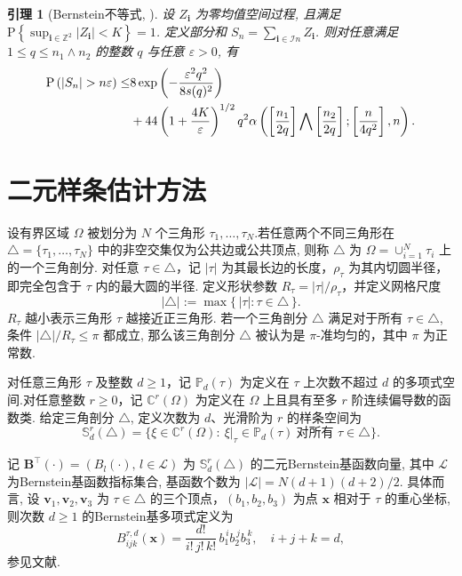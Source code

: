 \documentclass[a4paper,openay,14pt]{ctexbook}
\numberwithin{equation}{section}
\numberwithin{lem}{section}
\newtheorem{lemma}[theorem]{引理}%
\begin{document}
\begin{lemma}[Bernstein不等式, \cite{yao2003exponential}]\label{Lemma:Bernstein}
设 ${Z_{\mathbf{i}}}$ 为零均值空间过程, 且满足$\mathrm{P}\left\{\sup_{\mathbf{i}\in\mathbb{Z}^2}\left\vert Z_{\mathbf{i}}\right\vert<K\right\} = 1$. 定义部分和 $S_n=\sum_{\mathbf{i}\in\mathcal{I}n} Z_{\mathbf{i}}$. 则对任意满足 $1\le q\le n_1\wedge n_2$ 的整数 $q$ 与任意 $\varepsilon>0$, 有
\begin{align*}
    \mathrm{P}\left(\left|S_n\right|>n \varepsilon\right) \leq
    &8\exp \left(-\frac{\varepsilon^2 q^2}{8 s(q)^2}\right)\notag\\
    &+ 44\left(1+\frac{4 K}{\varepsilon}\right)^{1 / 2} q^2 \alpha\left(\left[\frac{n_1}{2 q}\right] \bigwedge\left[\frac{n_2}{2 q}\right] ;\left[\frac{n}{4 q^2}\right], n\right).
    \end{align*}
\end{lemma}

\section{二元样条估计方法}\label{BST}

设有界区域 $\Omega$ 被划分为 $N$ 个三角形 $\tau_{1},\ldots,\tau_{N}$.若任意两个不同三角形在 $\triangle=\{\tau_{1},\ldots,\tau_{N}\}$ 中的非空交集仅为公共边或公共顶点, 则称 $\triangle$ 为 $\Omega=\cup_{i=1}^N \tau_i$ 上的一个三角剖分. 对任意 $\tau\in\triangle$，记 $|\tau|$ 为其最长边的长度，$\rho_\tau$ 为其内切圆半径，即完全包含于 $\tau$ 内的最大圆的半径. 定义形状参数 $R_\tau=|\tau|/\rho_\tau$，并定义网格尺度
\[
|\triangle|:=\max\{\,|\tau|:\tau\in\triangle\,\}.
\]
$R_\tau$ 越小表示三角形 $\tau$ 越接近正三角形. 若一个三角剖分 \(\triangle\) 满足对于所有 \(\tau \in \triangle\), 条件 \(|\triangle|/R_\tau \leq \pi\) 都成立, 那么该三角剖分 \(\triangle\) 被认为是 \(\pi\)-准均匀的，其中 \(\pi\) 为正常数.

对任意三角形 $\tau$ 及整数 $d\ge 1$，记 $\mathbb{P}_d(\tau)$ 为定义在 $\tau$ 上次数不超过 $d$ 的多项式空间.对任意整数 $r\ge 0$，记 $\mathbb{C}^{r}(\Omega)$ 为定义在 $\Omega$ 上且具有至多 $r$ 阶连续偏导数的函数类. 给定三角剖分 $\triangle$, 定义次数为 $d$、光滑阶为 $r$ 的样条空间为
\begin{equation}\label{DEF:S_rd}
  \mathbb{S}_{d}^{r}(\triangle)
  = \bigl\{\xi\in \mathbb{C}^{r}(\Omega): \ \xi|_{\tau}\in \mathbb{P}_d(\tau)\ \text{对所有 } \tau\in\triangle \bigr\}.
\end{equation}

记 $\mathbf{B}^\top(\boldsymbol{\cdot})=\left(B_{l}(\boldsymbol{\cdot}),\,l\in\mathcal{L}\right)$ 为 $\mathbb{S}_{d}^{r}(\triangle)$ 的二元Bernstein基函数向量, 其中 $\mathcal{L}$ 为Bernstein基函数指标集合, 基函数个数为
$|\mathcal{L}|=N(d+1)(d+2)/2$.
具体而言, 设 $\mathbf{v}_1,\mathbf{v}_2,\mathbf{v}_3$ 为 $\tau\in\triangle$ 的三个顶点，$(b_1,b_2,b_3)$ 为点 $\boldsymbol{x}$ 相对于 $\tau$ 的重心坐标, 则次数 $d\ge 1$ 的Bernstein基多项式定义为
\[
B^{\tau,d}_{ijk}(\boldsymbol{x})
=\frac{d!}{i!\,j!\,k!}\,b_1^{\,i} b_2^{\,j} b_3^{\,k},
\quad i+j+k=d,
\]
参见文献\cite{lai2007spline}. 
\end{document}

